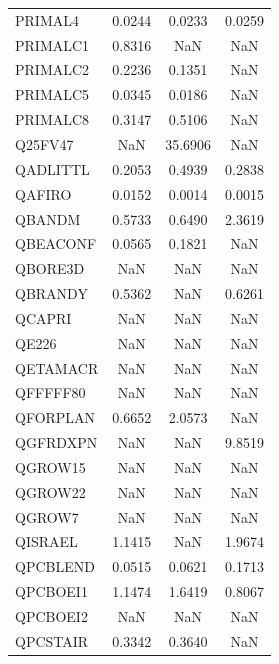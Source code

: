 \begin{longtable}{lccc}
PRIMAL4  &        0.0244 &        0.0233 &        0.0259 \\
PRIMALC1 &        0.8316 &           NaN &           NaN \\
PRIMALC2 &        0.2236 &        0.1351 &           NaN \\
PRIMALC5 &        0.0345 &        0.0186 &           NaN \\
PRIMALC8 &        0.3147 &        0.5106 &           NaN \\
Q25FV47  &           NaN &       35.6906 &           NaN \\
QADLITTL &        0.2053 &        0.4939 &        0.2838 \\
QAFIRO   &        0.0152 &        0.0014 &        0.0015 \\
QBANDM   &        0.5733 &        0.6490 &        2.3619 \\
QBEACONF &        0.0565 &        0.1821 &           NaN \\
QBORE3D  &           NaN &           NaN &           NaN \\
QBRANDY  &        0.5362 &           NaN &        0.6261 \\
QCAPRI   &           NaN &           NaN &           NaN \\
QE226    &           NaN &           NaN &           NaN \\
QETAMACR &           NaN &           NaN &           NaN \\
QFFFFF80 &           NaN &           NaN &           NaN \\
QFORPLAN &        0.6652 &        2.0573 &           NaN \\
QGFRDXPN &           NaN &           NaN &        9.8519 \\
QGROW15  &           NaN &           NaN &           NaN \\
QGROW22  &           NaN &           NaN &           NaN \\
QGROW7   &           NaN &           NaN &           NaN \\
QISRAEL  &        1.1415 &           NaN &        1.9674 \\
QPCBLEND &        0.0515 &        0.0621 &        0.1713 \\
QPCBOEI1 &        1.1474 &        1.6419 &        0.8067 \\
QPCBOEI2 &           NaN &           NaN &           NaN \\
QPCSTAIR &        0.3342 &        0.3640 &           NaN \\

\end{longtable}
